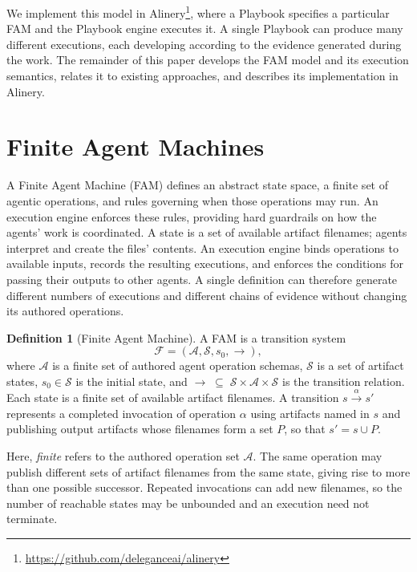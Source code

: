 \documentclass[letterpaper]{article}
\theoremstyle{definition}
\newtheorem{definition}{Definition}
\begin{document}
We implement this model in Alinery\footnote{\url{https://github.com/deleganceai/alinery}}, where a Playbook specifies a particular FAM and the Playbook engine executes it. A single Playbook can produce many different executions, each developing according to the evidence generated during the work. The remainder of this paper develops the FAM model and its execution semantics, relates it to existing approaches, and describes its implementation in Alinery.

\section{Finite Agent Machines}
\label{sec:fam-definition-execution}








A Finite Agent Machine (FAM) defines an abstract state space, a finite set of
agentic operations, and rules governing when those operations may run. An
execution engine enforces these rules, providing hard guardrails on how the
agents' work is coordinated. A state is a set of available artifact filenames;
agents interpret and create the files' contents. An
execution engine binds
operations to available inputs, records the resulting executions, and
enforces the conditions for passing their outputs to other agents. A single
definition can therefore generate different numbers of executions and
different chains of evidence without changing its authored operations.

\begin{definition}[Finite Agent Machine]
A FAM is a transition system
\[
  \mathcal{F}=(\mathcal{A},\mathcal{S},s_0,\rightarrow),
\]
where $\mathcal{A}$ is a finite set of authored agent operation schemas,
$\mathcal{S}$ is a set of artifact states, $s_0\in\mathcal{S}$ is the
initial state, and
$\rightarrow\;\subseteq\;\mathcal{S}\times\mathcal{A}\times\mathcal{S}$
is the transition relation. Each state is a finite set of available artifact
filenames. A transition \mbox{$s\xrightarrow{\alpha}s'$} represents a completed
invocation of operation $\alpha$ using artifacts named in $s$ and publishing
output artifacts whose filenames form a set $P$, so that $s'=s\cup P$.
\end{definition}

Here, \emph{finite} refers to the authored operation set $\mathcal{A}$.
The same operation may publish different sets of artifact filenames from
the same state, giving rise to more than one possible successor. Repeated invocations
can add new filenames, so the number of reachable states may be unbounded
and an execution need not terminate.
\end{document}
